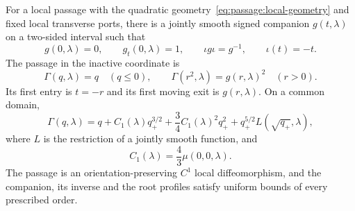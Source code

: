 \begin{proposition}
\label{prop:quadratic-passage}\label{prop:passage:quadratic}
For a local passage with the quadratic geometry~\eqref{eq:passage:local-geometry}
and fixed local transverse ports, there is a jointly smooth
signed companion $g(t,\lambda)$ on a two-sided interval such that
\begin{equation}\label{eq:passage:reversal}
 g(0,\lambda)=0,\qquad g_t(0,\lambda)=1,\qquad
 \iota g\iota=g^{-1},\qquad \iota(t)=-t.
\end{equation}
The passage in the inactive coordinate is
\begin{equation}\label{eq:passage:physical}
 \Gamma(q,\lambda)=q\quad(q\leq0),\qquad
 \Gamma(r^2,\lambda)=g(r,\lambda)^2\quad(r>0).
\end{equation}
Its first entry is $t=-r$ and its first moving exit is $g(r,\lambda)$.
On a common domain,
\begin{equation}\label{eq:passage:quadratic-jet}
 \Gamma(q,\lambda)
 =q+C_1(\lambda)q_+^{3/2}
       +\frac34C_1(\lambda)^2q_+^2
       +q_+^{5/2}L(\sqrt{q_+},\lambda),
\end{equation}
where $L$ is the restriction of a jointly smooth function, and
\begin{equation}\label{eq:passage:strength-jet}
 C_1(\lambda)=\frac43\mu(0,0,\lambda).
\end{equation}
The passage is an orientation-preserving $C^1$ local diffeomorphism, and the
companion, its inverse and the root profiles satisfy uniform bounds of every
prescribed order.
\end{proposition}

